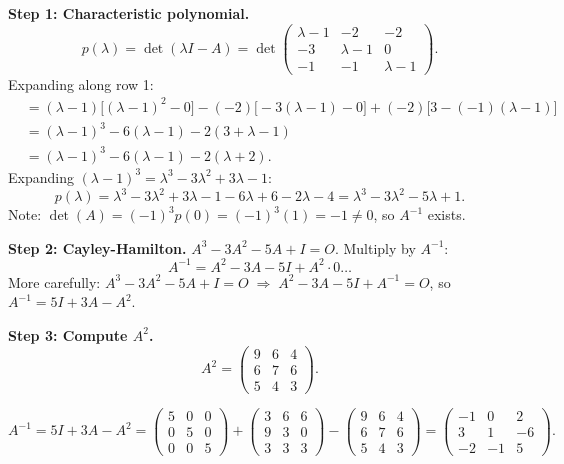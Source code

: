 \documentclass[12pt,a3paper]{article}
\begin{document}
\begin{tcolorbox}[enhanced,breakable,
  colback=cA!4,colframe=cA,boxrule=0.8pt,arc=5pt,
  title={\textbf{Answer --- Cayley-Hamilton; $A^{-1}$ for
    $A=\begin{pmatrix}1&2&2\\3&1&0\\1&1&1\end{pmatrix}$}},
  fonttitle=\bfseries\color{white},colbacktitle=cA]

\textbf{Step 1: Characteristic polynomial.}
\[
  p(\lambda)=\det(\lambda I-A)
  =\det\begin{pmatrix}\lambda-1&-2&-2\\-3&\lambda-1&0\\-1&-1&\lambda-1\end{pmatrix}.
\]
Expanding along row 1:
\begin{align*}
  &=(\lambda-1)\bigl[(\lambda-1)^2-0\bigr]
   -(-2)\bigl[-3(\lambda-1)-0\bigr]
   +(-2)\bigl[3-(-1)(\lambda-1)\bigr]\\
  &=(\lambda-1)^3 - 6(\lambda-1) - 2(3+\lambda-1)\\
  &=(\lambda-1)^3 - 6(\lambda-1) - 2(\lambda+2).
\end{align*}
Expanding $(\lambda-1)^3=\lambda^3-3\lambda^2+3\lambda-1$:
\[
  p(\lambda)=\lambda^3-3\lambda^2+3\lambda-1-6\lambda+6-2\lambda-4
  =\lambda^3-3\lambda^2-5\lambda+1.
\]
Note: $\det(A)=(-1)^3 p(0)=(-1)^3(1)=-1\neq0$, so $A^{-1}$ exists.


\textbf{Step 2: Cayley-Hamilton.}
$A^3-3A^2-5A+I=O$. Multiply by $A^{-1}$:
\[
  A^{-1} = A^2-3A-5I+A^2 \cdot 0\ldots
\]
More carefully: $A^3-3A^2-5A+I=O \;\Rightarrow\; A^2-3A-5I+A^{-1}=O$,
so $A^{-1}=5I+3A-A^2$.

\textbf{Step 3: Compute $A^2$.}
\[
  A^2=\begin{pmatrix}9&6&4\\6&7&6\\5&4&3\end{pmatrix}.
\]

\[
  A^{-1}=5I+3A-A^2
  =\begin{pmatrix}5&0&0\\0&5&0\\0&0&5\end{pmatrix}
  +\begin{pmatrix}3&6&6\\9&3&0\\3&3&3\end{pmatrix}
  -\begin{pmatrix}9&6&4\\6&7&6\\5&4&3\end{pmatrix}
  =\begin{pmatrix}-1&0&2\\3&1&-6\\-2&-1&5\end{pmatrix}.
\]


\end{tcolorbox}
\end{document}
